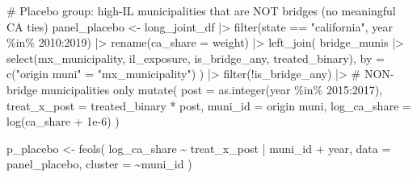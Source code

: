 \documentclass[
  11pt,
  letterpaper,
  DIV=11,
  numbers=noendperiod]{scrartcl}
\newenvironment{Shaded}{}{}
\newcommand{\AttributeTok}[1]{\textcolor[rgb]{0.84,0.23,0.29}{#1}}
\newcommand{\CommentTok}[1]{\textcolor[rgb]{0.42,0.45,0.49}{#1}}
\newcommand{\DecValTok}[1]{\textcolor[rgb]{0.00,0.36,0.77}{#1}}
\newcommand{\FloatTok}[1]{\textcolor[rgb]{0.00,0.36,0.77}{#1}}
\newcommand{\FunctionTok}[1]{\textcolor[rgb]{0.44,0.26,0.76}{#1}}
\newcommand{\NormalTok}[1]{\textcolor[rgb]{0.14,0.16,0.18}{#1}}
\newcommand{\OtherTok}[1]{\textcolor[rgb]{0.44,0.26,0.76}{#1}}
\newcommand{\SpecialCharTok}[1]{\textcolor[rgb]{0.00,0.36,0.77}{#1}}
\newcommand{\StringTok}[1]{\textcolor[rgb]{0.01,0.18,0.38}{#1}}
\begin{document}
\begin{Shaded}
\begin{Highlighting}[]
\CommentTok{\# Placebo group: high{-}IL municipalities that are NOT bridges (no meaningful CA ties)}
\NormalTok{panel\_placebo }\OtherTok{\textless{}{-}}\NormalTok{ long\_joint\_df }\SpecialCharTok{|\textgreater{}}
  \FunctionTok{filter}\NormalTok{(state }\SpecialCharTok{==} \StringTok{"california"}\NormalTok{, year }\SpecialCharTok{\%in\%} \DecValTok{2010}\SpecialCharTok{:}\DecValTok{2019}\NormalTok{) }\SpecialCharTok{|\textgreater{}}
  \FunctionTok{rename}\NormalTok{(}\AttributeTok{ca\_share =}\NormalTok{ weight) }\SpecialCharTok{|\textgreater{}}
  \FunctionTok{left\_join}\NormalTok{(}
\NormalTok{    bridge\_munis }\SpecialCharTok{|\textgreater{}}
      \FunctionTok{select}\NormalTok{(mx\_municipality, il\_exposure, is\_bridge\_any, treated\_binary),}
    \AttributeTok{by =} \FunctionTok{c}\NormalTok{(}\StringTok{"origin muni"} \OtherTok{=} \StringTok{"mx\_municipality"}\NormalTok{)}
\NormalTok{  ) }\SpecialCharTok{|\textgreater{}}
  \FunctionTok{filter}\NormalTok{(}\SpecialCharTok{!}\NormalTok{is\_bridge\_any) }\SpecialCharTok{|\textgreater{}}             \CommentTok{\# NON{-}bridge municipalities only}
  \FunctionTok{mutate}\NormalTok{(}
    \AttributeTok{post         =} \FunctionTok{as.integer}\NormalTok{(year }\SpecialCharTok{\%in\%} \DecValTok{2015}\SpecialCharTok{:}\DecValTok{2017}\NormalTok{),}
    \AttributeTok{treat\_x\_post =}\NormalTok{ treated\_binary }\SpecialCharTok{*}\NormalTok{ post,}
    \AttributeTok{muni\_id      =} \StringTok{\textasciigrave{}}\AttributeTok{origin muni}\StringTok{\textasciigrave{}}\NormalTok{,}
    \AttributeTok{log\_ca\_share =} \FunctionTok{log}\NormalTok{(ca\_share }\SpecialCharTok{+} \FloatTok{1e{-}6}\NormalTok{)}
\NormalTok{  )}

\NormalTok{p\_placebo }\OtherTok{\textless{}{-}} \FunctionTok{feols}\NormalTok{(}
\NormalTok{  log\_ca\_share }\SpecialCharTok{\textasciitilde{}}\NormalTok{ treat\_x\_post }\SpecialCharTok{|}\NormalTok{ muni\_id }\SpecialCharTok{+}\NormalTok{ year,}
  \AttributeTok{data    =}\NormalTok{ panel\_placebo,}
  \AttributeTok{cluster =} \SpecialCharTok{\textasciitilde{}}\NormalTok{muni\_id}
\NormalTok{)}


\end{Highlighting}
\end{Shaded}
\end{document}
